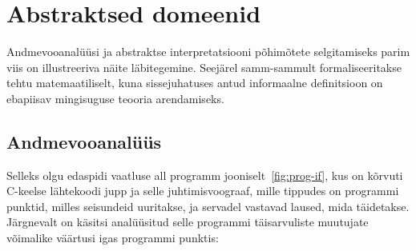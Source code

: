 \documentclass[../thesis.tex]{subfiles}
\begin{document}
\section{Abstraktsed domeenid}
Andmevooanalüüsi ja abstraktse interpretatsiooni põhimõtete selgitamiseks parim viis on illustreeriva näite läbitegemine.
Seejärel samm-sammult formaliseeritakse tehtu matemaatiliselt, kuna sissejuhatuses antud informaalne definitsioon on ebapiisav mingisuguse teooria arendamiseks.

\subsection{Andmevooanalüüs}
Selleks olgu edaspidi vaatluse all programm jooniselt~\ref{fig:prog-if}, kus on kõrvuti C-keelse lähtekoodi jupp ja selle juhtimisvoograaf, mille tippudes on programmi punktid, milles seisundeid uuritakse, ja servadel vastavad laused, mida täidetakse.
Järgnevalt on käsitsi analüüsitud selle programmi täisarvuliste muutujate võimalike väärtusi igas programmi punktis:
\end{document}
